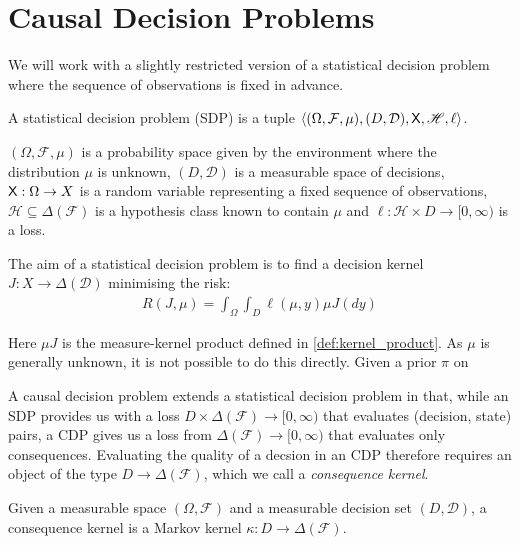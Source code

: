 \section{Causal Decision Problems}

We will work with a slightly restricted version of a statistical decision problem where the sequence of observations is fixed in advance.

\begin{definition}
A statistical decision problem (SDP) is a tuple $\langle (\Omega,\mathcal{F},\mu), (D,\mathcal{D}), \mathsf{X}, \mathscr{H}, \ell\rangle$. 

$(\Omega,\mathcal{F},\mu)$ is a probability space given by the environment where the distribution $\mu$ is unknown, $(D,\mathcal{D})$ is a measurable space of decisions, $\mathsf{X}:\Omega\to X$ is a random variable representing a fixed sequence of observations, $\mathscr{H}\subseteq\Delta(\mathcal{F})$ is a hypothesis class known to contain $\mu$ and $\ell:\mathscr{H}\times D\to [0,\infty)$ is a loss.

The aim of a statistical decision problem is to find a decision kernel $J:X\to \Delta(\mathcal{D})$ minimising the risk:
\begin{align}
    R(J,\mu) = \int_{\Omega}\int_D \ell(\mu,y) \mu J(dy)
\end{align}
\end{definition}

Here $\mu J$ is the measure-kernel product defined in \ref{def:kernel_product}. As $\mu$ is generally unknown, it is not possible to do this directly. Given a prior $\pi$ on 


A causal decision problem extends a statistical decision problem in that, while an SDP provides us with a loss $D\times \Delta(\mathcal{F})\to [0,\infty)$ that evaluates (decision, state) pairs, a CDP gives us a loss from $\Delta(\mathcal{F})\to [0,\infty)$ that evaluates only consequences. Evaluating the quality of a decsion in an CDP therefore requires an object of the type $D\to \Delta(\mathcal{F})$, which we call a \emph{consequence kernel}.

\begin{definition}
Given a measurable space $(\Omega,\mathcal{F})$ and a measurable decision set $(D,\mathcal{D})$, a consequence kernel is a Markov kernel $\kappa:D \to \Delta(\mathcal{F})$.
\end{definition}

